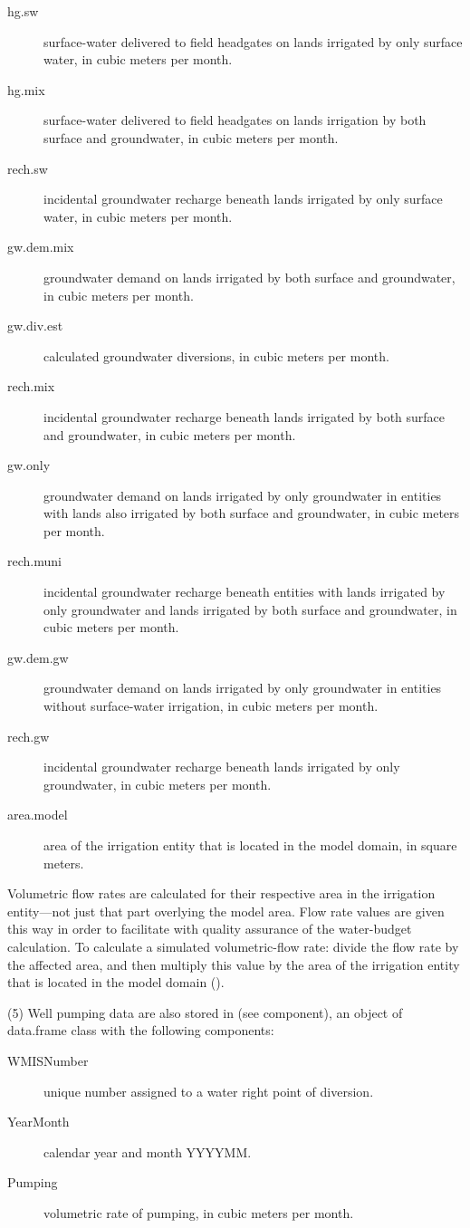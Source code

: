 \documentclass[a4paper]{book}
\begin{document}
\begin{Value}
\begin{description}
\item[hg.sw] surface-water delivered to field headgates on lands irrigated by only surface water,
in cubic meters per month.
\item[hg.mix] surface-water delivered to field headgates on lands irrigation by both surface and groundwater,
in cubic meters per month.
\item[rech.sw] incidental groundwater recharge beneath lands irrigated by only surface water,
in cubic meters per month.
\item[gw.dem.mix] groundwater demand on lands irrigated by both surface and groundwater,
in cubic meters per month.
\item[gw.div.est] calculated groundwater diversions, in cubic meters per month.
\item[rech.mix] incidental groundwater recharge beneath lands irrigated by both surface and groundwater,
in cubic meters per month.
\item[gw.only] groundwater demand on lands irrigated by only groundwater in entities with
lands also irrigated by both surface and groundwater, in cubic meters per month.
\item[rech.muni] incidental groundwater recharge beneath entities with
lands irrigated by only groundwater and lands irrigated by both surface and groundwater,
in cubic meters per month.
\item[gw.dem.gw] groundwater demand on lands irrigated by only groundwater in
entities without surface-water irrigation, in cubic meters per month.
\item[rech.gw] incidental groundwater recharge beneath lands irrigated by only groundwater,
in cubic meters per month.
\item[area.model] area of the irrigation entity that is located in the model domain,
in square meters.

\end{description}

Volumetric flow rates are calculated for their respective area in
the irrigation entity---not just that part overlying the model area.
Flow rate values are given this way in order to facilitate with quality assurance of
the water-budget calculation.
To calculate a simulated volumetric-flow rate: divide the flow rate by the affected area,
and then multiply this value by the area of the irrigation entity that is located in
the model domain ().

(5) Well pumping data are also stored in  (see  component),
an object of data.frame class with the following components:
\begin{description}

\item[WMISNumber] unique number assigned to a water right point of diversion.
\item[YearMonth] calendar year and month YYYYMM.
\item[Pumping] volumetric rate of pumping, in cubic meters per month.

\end{description}

\end{Value}
\end{document}
